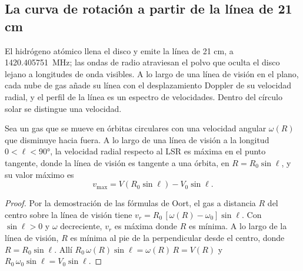 \subsection*{La curva de rotación a partir de la línea de 21 cm}

El hidrógeno atómico llena el disco y emite la línea de 21 cm, a
\qty{1420.405751}{MHz}; las ondas de radio atraviesan el polvo que oculta el
disco lejano a longitudes de onda visibles. A lo largo de una línea de visión
en el plano, cada nube de gas añade su línea con el desplazamiento Doppler de
su velocidad radial, y el perfil de la línea es un espectro de
velocidades. Dentro del círculo solar se distingue una velocidad.

\begin{theorem}\label{thm:b3:milky-way-galaxies:tangent}
Sea un gas que se mueve en órbitas circulares con una velocidad angular $\omega(R)$ que
disminuye hacia fuera. A lo largo de una línea de visión a la longitud
$0 < \ell < \ang{90}$, la velocidad radial respecto al LSR es máxima
en el punto tangente, donde la línea de visión es tangente a una órbita, en
$R = R_0\sin\ell$, y su valor máximo es
\[
v_\mathrm{max} = V(R_0\sin\ell) - V_0\sin\ell .
\]
\end{theorem}

\begin{proof}
Por la demostración de las fórmulas de Oort, el gas a distancia $R$ del centro sobre
la línea de visión tiene $v_r = R_0\,[\omega(R) - \omega_0]\sin\ell$. Con
$\sin\ell > 0$ y $\omega$ decreciente, $v_r$ es máxima donde $R$ es
mínima. A lo largo de la línea de visión, $R$ es mínima al pie de la
perpendicular desde el centro, donde $R = R_0\sin\ell$. Allí
$R_0\,\omega(R)\sin\ell = \omega(R)\,R = V(R)$ y
$R_0\,\omega_0\sin\ell = V_0\sin\ell$.
\end{proof}

